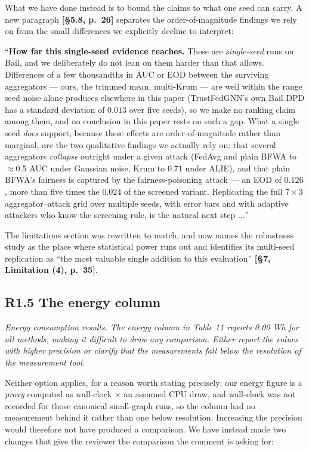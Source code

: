 \documentclass[11pt,a4paper]{article}
\newenvironment{comment}
  {\begin{mdframed}[backgroundcolor=quotegray,linewidth=0pt,skipabove=8pt,
    skipbelow=6pt,innertopmargin=6pt,innerbottommargin=6pt]\itshape}
  {\end{mdframed}}
\newenvironment{newtextbox}
  {\begin{mdframed}[linecolor=newtext!45,linewidth=0.8pt,skipabove=6pt,
    skipbelow=8pt,innertopmargin=6pt,innerbottommargin=6pt]\small}
  {\end{mdframed}}
\newcommand{\where}[1]{\textcolor{revblue}{\textbf{[#1]}}}
\begin{document}
What we have done instead is to bound the claims to what one seed can carry. A
new paragraph \where{\S5.8, p.~26} separates the order-of-magnitude findings we
rely on from the small differences we explicitly decline to interpret:

\begin{newtextbox}
``\textbf{How far this single-seed evidence reaches.} These are
\emph{single-seed} runs on Bail, and we deliberately do not lean on them harder
than that allows. Differences of a few thousandths in AUC or EOD between the
surviving aggregators --- ours, the trimmed mean, multi-Krum --- are well within
the range seed noise alone produces elsewhere in this paper (TrustFedGNN's own
Bail DPD has a standard deviation of $0.013$ over five seeds), so we make no
ranking claim among them, and no conclusion in this paper rests on such a gap.
What a single seed \emph{does} support, because these effects are
order-of-magnitude rather than marginal, are the two qualitative findings we
actually rely on: that several aggregators \emph{collapse} outright under a
given attack (FedAvg and plain BFWA to $\approx 0.5$ AUC under Gaussian noise,
Krum to $0.71$ under ALIE), and that plain BFWA's fairness is captured by the
fairness-poisoning attack --- an EOD of $0.126$, more than five times the
$0.024$ of the screened variant. Replicating the full $7\times3$
aggregator--attack grid over multiple seeds, with error bars and with adaptive
attackers who know the screening rule, is the natural next step $\dots$''
\end{newtextbox}

The limitations section was rewritten to match, and now names the robustness
study as the place where statistical power runs out and identifies its
multi-seed replication as ``the most valuable single addition to this
evaluation'' \where{\S7, Limitation (4), p.~35}.

\subsection*{R1.5 The energy column}

\begin{comment}
Energy consumption results. The energy column in Table 11 reports 0.00 Wh for
all methods, making it difficult to draw any comparison. Either report the
values with higher precision or clarify that the measurements fall below the
resolution of the measurement tool.
\end{comment}

Neither option applies, for a reason worth stating precisely: our energy figure
is a \emph{proxy} computed as wall-clock $\times$ an assumed CPU draw, and
wall-clock was not recorded for those canonical small-graph runs, so the column
had no measurement behind it rather than one below resolution. Increasing the
precision would therefore not have produced a comparison. We have instead made
two changes that give the reviewer the comparison the comment is asking for:
\end{document}
